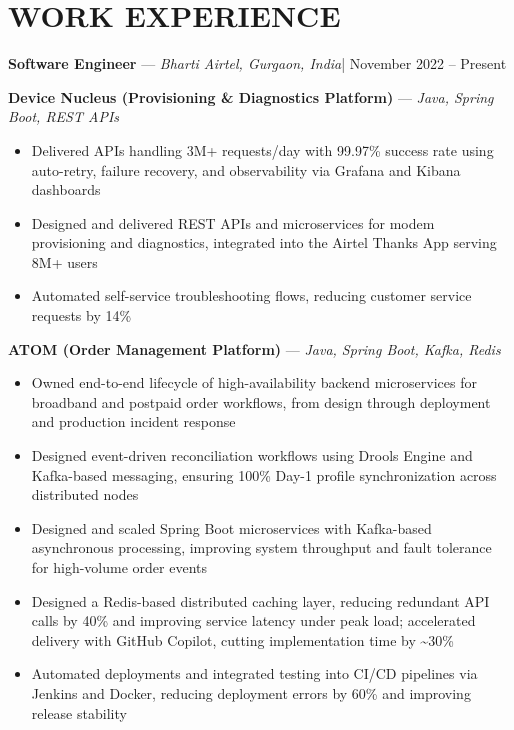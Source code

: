\documentclass[10.5pt,a4paper]{article}
\newcommand{\role}[3]{\textbf{\large #1} \hspace{0.4em}---\hspace{0.4em} \textit{#2}\hfill {\color{greytxt}\small | #3}\par\vspace{2pt}}
\newcommand{\proj}[2]{\vspace{4pt}\textbf{#1} \hspace{0.3em}---\hspace{0.3em} \textit{#2}\par\vspace{-1pt}}
\newenvironment{bul}{\begin{itemize}[leftmargin=2.2em,itemsep=2pt,topsep=2pt,parsep=0pt,label=\textbullet]}{\end{itemize}}
\begin{document}
\section{WORK EXPERIENCE}
\role{Software Engineer}{Bharti Airtel, Gurgaon, India}{November 2022 -- Present}

\proj{Device Nucleus (Provisioning \& Diagnostics Platform)}{Java, Spring Boot, REST APIs}
\begin{bul}
\item Delivered APIs handling 3M+ requests/day with 99.97\% success rate using auto-retry, failure recovery, and observability via Grafana and Kibana dashboards
\item Designed and delivered REST APIs and microservices for modem provisioning and diagnostics, integrated into the Airtel Thanks App serving 8M+ users
\item Automated self-service troubleshooting flows, reducing customer service requests by 14\%
\end{bul}

\proj{ATOM (Order Management Platform)}{Java, Spring Boot, Kafka, Redis}
\begin{bul}
\item Owned end-to-end lifecycle of high-availability backend microservices for broadband and postpaid order workflows, from design through deployment and production incident response
\item Designed event-driven reconciliation workflows using Drools Engine and Kafka-based messaging, ensuring 100\% Day-1 profile synchronization across distributed nodes
\item Designed and scaled Spring Boot microservices with Kafka-based asynchronous processing, improving system throughput and fault tolerance for high-volume order events
\item Designed a Redis-based distributed caching layer, reducing redundant API calls by 40\% and improving service latency under peak load; accelerated delivery with GitHub Copilot, cutting implementation time by \textasciitilde30\%
\item Automated deployments and integrated testing into CI/CD pipelines via Jenkins and Docker, reducing deployment errors by 60\% and improving release stability
\end{bul}
\end{document}
